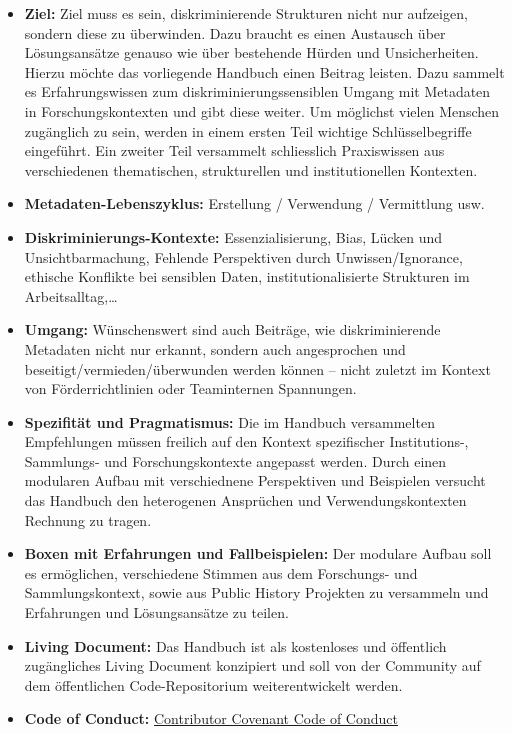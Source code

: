 \documentclass[
  letterpaper,
  DIV=11,
  numbers=noendperiod]{scrartcl}
\providecommand{\tightlist}{%
  \setlength{\itemsep}{0pt}\setlength{\parskip}{0pt}}\usepackage{longtable,booktabs,array}
\begin{document}
\begin{itemize}
  \begin{itemize}
  \tightlist
  \item
    \textbf{Ziel:} Ziel muss es sein, diskriminierende Strukturen nicht
    nur aufzeigen, sondern diese zu überwinden. Dazu braucht es einen
    Austausch über Lösungsansätze genauso wie über bestehende Hürden und
    Unsicherheiten. Hierzu möchte das vorliegende Handbuch einen Beitrag
    leisten. Dazu sammelt es Erfahrungswissen zum
    diskriminierungssensiblen Umgang mit Metadaten in
    Forschungskontexten und gibt diese weiter. Um möglichst vielen
    Menschen zugänglich zu sein, werden in einem ersten Teil wichtige
    Schlüsselbegriffe eingeführt. Ein zweiter Teil versammelt
    schliesslich Praxiswissen aus verschiedenen thematischen,
    strukturellen und institutionellen Kontexten.
  \item
    \textbf{Metadaten-Lebenszyklus:} Erstellung / Verwendung /
    Vermittlung usw.
  \item
    \textbf{Diskriminierungs-Kontexte:} Essenzialisierung, Bias, Lücken
    und Unsichtbarmachung, Fehlende Perspektiven durch
    Unwissen/Ignorance, ethische Konflikte bei sensiblen Daten,
    institutionalisierte Strukturen im Arbeitsalltag,\ldots{}
  \item
    \textbf{Umgang:} Wünschenswert sind auch Beiträge, wie
    diskriminierende Metadaten nicht nur erkannt, sondern auch
    angesprochen und beseitigt/vermieden/überwunden werden können --
    nicht zuletzt im Kontext von Förderrichtlinien oder Teaminternen
    Spannungen.
  \item
    \textbf{Spezifität und Pragmatismus:} Die im Handbuch versammelten
    Empfehlungen müssen freilich auf den Kontext spezifischer
    Institutions-, Sammlungs- und Forschungskontexte angepasst werden.
    Durch einen modularen Aufbau mit verschiednene Perspektiven und
    Beispielen versucht das Handbuch den heterogenen Ansprüchen und
    Verwendungskontexten Rechnung zu tragen.
  \item
    \textbf{Boxen mit Erfahrungen und Fallbeispielen:} Der modulare
    Aufbau soll es ermöglichen, verschiedene Stimmen aus dem Forschungs-
    und Sammlungskontext, sowie aus Public History Projekten zu
    versammeln und Erfahrungen und Lösungsansätze zu teilen.
  \item
    \textbf{Living Document:} Das Handbuch ist als kostenloses und
    öffentlich zugängliches Living Document konzipiert und soll von der
    Community auf dem öffentlichen Code-Repositorium weiterentwickelt
    werden.
  \item
    \textbf{Code of Conduct:}
    \href{https://www.contributor-covenant.org/version/2/1/code_of_conduct/}{Contributor
    Covenant Code of Conduct}
  \end{itemize}
\end{itemize}
\end{document}
